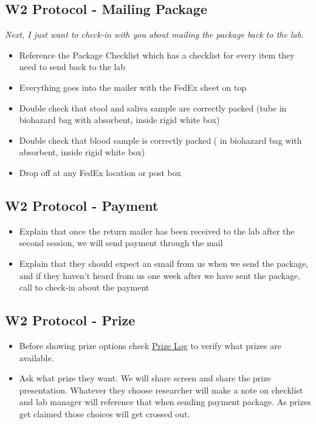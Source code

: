 \documentclass[]{book}
\providecommand{\tightlist}{%
  \setlength{\itemsep}{0pt}\setlength{\parskip}{0pt}}
\begin{document}
\hypertarget{w2-protocol---mailing-package}{%
\subsection{W2 Protocol - Mailing Package}\label{w2-protocol---mailing-package}}

\emph{Next, I just want to check-in with you about mailing the package back to the lab.}

\begin{itemize}
\item
  Reference the Package Checklist which has a checklist for every item they need to send back to the lab
\item
  Everything goes into the mailer with the FedEx sheet on top
\item
  Double check that stool and saliva sample are correctly packed (tube in biohazard bag with absorbent, inside rigid white box)
\item
  Double check that blood sample is correctly packed ( in biohazard bag with absorbent, inside rigid white box)
\item
  Drop off at any FedEx location or post box
\end{itemize}

\hypertarget{w2-protocol---payment}{%
\subsection{W2 Protocol - Payment}\label{w2-protocol---payment}}

\begin{itemize}
\item
  Explain that once the return mailer has been received to the lab after the second session, we will send payment through the mail
\item
  Explain that they should expect an email from us when we send the package, and if they haven't heard from us one week after we have sent the package, call to check-in about the payment
\end{itemize}

\hypertarget{w2-protocol---prize}{%
\subsection{W2 Protocol - Prize}\label{w2-protocol---prize}}

\begin{itemize}
\tightlist
\item
  Before showing prize options check \href{https://app.box.com/file/734579293509}{Prize Log} to verify what prizes are available.
\item
  Ask what prize they want. We will share screen and share the prize presentation. Whatever they choose researcher will make a note on checklist and lab manager will reference that when sending payment package. As prizes get claimed those choices will get crossed out.
\end{itemize}
\end{document}
